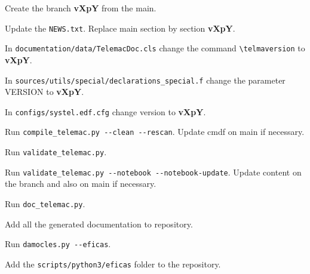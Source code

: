 \begin{todolist}
\setlength\itemsep{0.01em}
  \item Create the branch \textbf{vXpY} from the main.
  \item Update the \verb!NEWS.txt!. Replace main section by section
    \textbf{vXpY}.
  \item In \verb!documentation/data/TelemacDoc.cls! change the command
    \verb!\telmaversion! to \textbf{vXpY}.
  \item In \verb!sources/utils/special/declarations_special.f! change the
    parameter VERSION to \textbf{vXpY}.
  \item In \verb!configs/systel.edf.cfg! change version to \textbf{vXpY}.
  \item Run \verb!compile_telemac.py --clean --rescan!. Update cmdf on main if necessary.
  \item Run \verb!validate_telemac.py!.
  \item Run \verb!validate_telemac.py --notebook --notebook-update!.
            Update content on the branch and also on main if necessary.
  \item Run \verb!doc_telemac.py!.
  \item Add all the generated documentation to repository.
  \item Run \verb!damocles.py --eficas!.
  \item Add the \verb!scripts/python3/eficas! folder to the repository.
\end{todolist}
